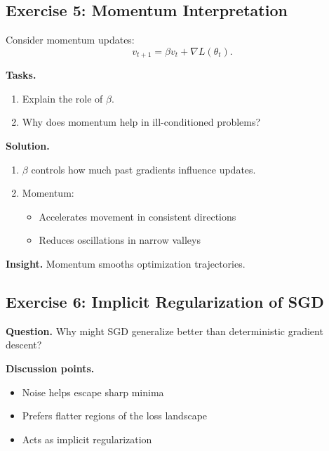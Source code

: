 \subsection{Exercise 5: Momentum Interpretation}

Consider momentum updates:
\[
v_{t+1} = \beta v_t + \nabla L(\theta_t).
\]

\medskip

\noindent
\textbf{Tasks.}
\begin{enumerate}
    \item Explain the role of $\beta$.
    \item Why does momentum help in ill-conditioned problems?
\end{enumerate}

\medskip

\noindent
\textbf{Solution.}

\begin{enumerate}
\item $\beta$ controls how much past gradients influence updates.

\item Momentum:
\begin{itemize}
    \item Accelerates movement in consistent directions
    \item Reduces oscillations in narrow valleys
\end{itemize}
\end{enumerate}

\medskip

\noindent
\textbf{Insight.}  
Momentum smooths optimization trajectories.

\subsection{Exercise 6: Implicit Regularization of SGD}

\textbf{Question.}  
Why might SGD generalize better than deterministic gradient descent?

\medskip

\noindent
\textbf{Discussion points.}

\begin{itemize}
    \item Noise helps escape sharp minima
    \item Prefers flatter regions of the loss landscape
    \item Acts as implicit regularization
\end{itemize}

